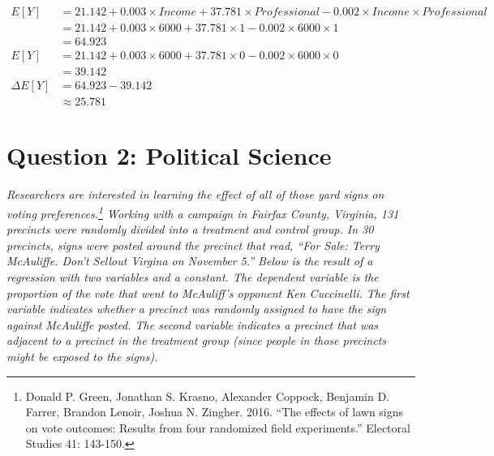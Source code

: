 \documentclass[12pt,letterpaper]{article}
\begin{document}
\begin{enumerate}
		\begin{align*}
		E[Y] &= 21.142 + 0.003 \times Income + 37.781 \times Professional - 0.002 \times Income \times Professional \\
		&= 21.142 + 0.003 \times 6000 + 37.781 \times 1 - 0.002 \times 6000 \times 1 \\
		&= 64.923 \\
		E[Y] &= 21.142 + 0.003 \times 6000 + 37.781 \times 0 - 0.002 \times 6000 \times 0 \\
		 &=39.142\\
		 \Delta E[Y] &= 64.923 - 39.142\\
		 &\approx25.781
		\end{align*}		\vspace{.25cm}

	\end{enumerate}

\section*{Question 2: Political Science}
		\vspace{.25cm}

\textit{Researchers are interested in learning the effect of all of those yard signs on voting preferences.\footnote{Donald P. Green, Jonathan	S. Krasno, Alexander Coppock, Benjamin D. Farrer, Brandon Lenoir, Joshua N. Zingher. 2016. ``The effects of lawn signs on vote outcomes: Results from four randomized field experiments.'' Electoral Studies 41: 143-150. } Working with a campaign in Fairfax County, Virginia, 131 precincts were randomly divided into a treatment and control group. In 30 precincts, signs were posted around the precinct that read, ``For Sale: Terry McAuliffe. Don't Sellout Virgina on November 5.'' 
	\noindent Below is the result of a regression with two variables and a constant.  The dependent variable is the proportion of the vote that went to McAuliff's opponent Ken Cuccinelli. The first variable indicates whether a precinct was randomly assigned to have the sign against McAuliffe posted. The second variable indicates a precinct that was adjacent to a precinct in the treatment group (since people in those precincts might be exposed to the signs).  }
\end{document}
